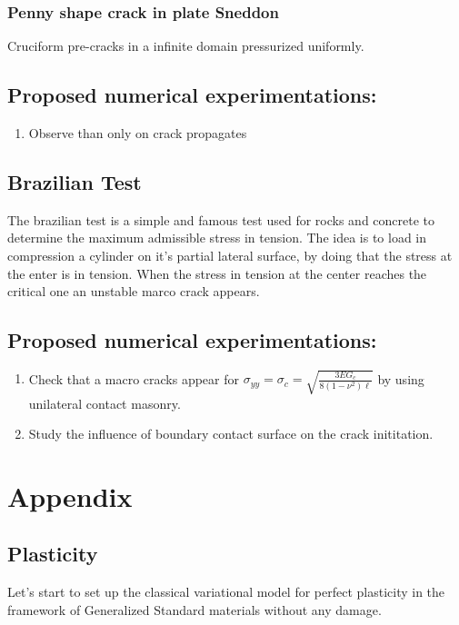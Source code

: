 \documentclass[10pt,oneside]{memoir}
\begin{document}
\subsection{Penny shape crack in plate Sneddon}
Cruciform pre-cracks in a infinite domain pressurized uniformly.

\section*{Proposed numerical experimentations:}
\begin{enumerate}
\item Observe than only on crack propagates
\end{enumerate}


\section{Brazilian Test}
The brazilian test is a simple and famous test used for rocks and concrete to determine the maximum admissible stress in tension. The idea is to load in compression a cylinder on it’s partial lateral surface, by doing that the stress at the enter is in tension. When the stress in tension at the center reaches the critical one an unstable marco crack appears.
\section*{Proposed numerical experimentations:}
\begin{enumerate}
\item Check that a macro cracks appear for $\sigma_{yy} = \sigma_c =  \sqrt{\frac{3EG_c}{8(1-\nu^2)\ell}} $ by using unilateral contact masonry.
\item Study the influence of boundary contact surface on the crack inititation.
\end{enumerate}



\appendix
\renewcommand{\thechapter}{A}
\chapter{Appendix}
\section{Plasticity}
\label{sec:Plasticity}
Let's start to set up the classical variational model for perfect plasticity in the framework of Generalized Standard materials without any damage.
\end{document}
